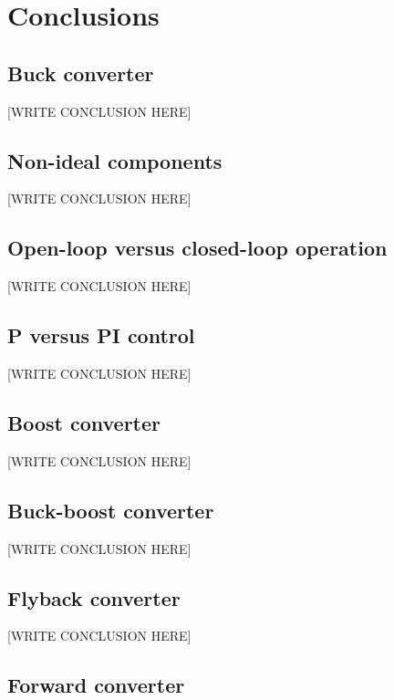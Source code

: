\documentclass[
  paper=a4,
  oneside  ,captions=tableheading
]{scrartcl}
\begin{document}
\section{Conclusions}\label{conclusions}

\subsection{Buck converter}\label{buck-converter}

{[}WRITE CONCLUSION HERE{]}

\subsection{Non-ideal components}\label{non-ideal-components}

{[}WRITE CONCLUSION HERE{]}

\subsection{Open-loop versus closed-loop
operation}\label{open-loop-versus-closed-loop-operation}

{[}WRITE CONCLUSION HERE{]}

\subsection{P versus PI control}\label{p-versus-pi-control}

{[}WRITE CONCLUSION HERE{]}

\subsection{Boost converter}\label{boost-converter}

{[}WRITE CONCLUSION HERE{]}

\subsection{Buck-boost converter}\label{buck-boost-converter}

{[}WRITE CONCLUSION HERE{]}

\subsection{Flyback converter}\label{flyback-converter}

{[}WRITE CONCLUSION HERE{]}

\subsection{Forward converter}\label{forward-converter}
\end{document}
